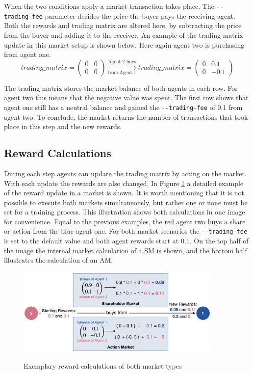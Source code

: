 When the two conditions apply a market transaction takes place. The \verb|--trading-fee| parameter decides the price the buyer pays the receiving agent. Both the rewards and trading matrix are altered here, by subtracting the price from the buyer and adding it to the receiver. An example of the trading matrix update in this market setup is shown below. Here again agent two is purchasing from agent one.
\begin{equation*}
trading\_matrix = 
\begin{pmatrix}
0 & 0 \\
0 & 0
\end{pmatrix} \xrightarrow[\text{from Agent 1}]{\text{Agent 2 buys}} 
trading\_matrix = 
\begin{pmatrix}
0 & 0.1 \\
0 & -0.1
\end{pmatrix} 
\end{equation*}

The trading matrix stores the market balance of both agents in each row. For agent two this means that the negative value was spent. The first row shows that agent one still has a neutral balance and gained the \verb|--trading-fee| of 0.1 from agent two. To conclude, the market returns the number of transactions that took place in this step and the new rewards.

\subsection{Reward Calculations}\label{market_reward_calc}
During each step agents can update the trading matrix by acting on the market. With each update the rewards are also changed. In Figure \ref{fig:market_rewards} a detailed example of the reward update in a market is shown. It is worth mentioning that it is not possible to execute both markets simultaneously, but rather one or none must be set for a training process. This illustration shows both calculations in one image for convenience. Equal to the previous examples, the red agent two buys a share or action from the blue agent one. For both market scenarios the \verb|--trading-fee| is set to the default value and both agent rewards start at 0.1. On the top half of the image the internal market calculation of a SM is shown, and the bottom half illustrates the calculation of an AM.
\begin{figure}[hpbt]
    \centering
    \includegraphics[width=0.9\textwidth]{pictures/new_market_rewards}\\
    \caption[Exemplary Reward Calculation Of Markets]{Exemplary reward calculations of both market types}\label{fig:market_rewards}
\end{figure}

